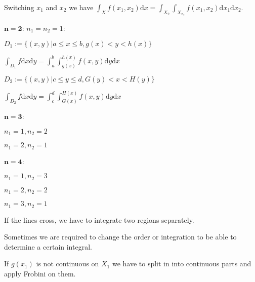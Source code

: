 Switching $x_1$ and $x_2$ we have 
$\int_X f(x_1, x_2) \mathrm{d}x = \int_{X_2} \int_{X_{x_2}} f(x_1, x_2) \mathrm{d}x_1 \mathrm{d}x_2$.

\begin{compactdesc}
    \item[$\mathbf{n = 2}$:] $n_1 = n_2 = 1$:
        \begin{compactitem}
            \item $D_1 := \{(x, y) | a \le x \le b, g(x) < y < h(x) \}$
                \begin{compactitem}
                    \item $\int_{D_1} f \mathrm{d}x \mathrm{d}y = \int_{a}^{b} \int_{g(x)}^{h(x)} f(x, y) \mathrm{d}y\mathrm{d}x$
                \end{compactitem}
            \item $D_2 := \{(x, y) | c \le y \le d, G(y) < x < H(y) \}$
                \begin{compactitem}
                    \item $\int_{D_2} f \mathrm{d}x \mathrm{d}y = \int_{c}^{d} \int_{G(x)}^{H(x)} f(x, y) \mathrm{d}y\mathrm{d}x$
                \end{compactitem}
        \end{compactitem}
    \item[$\mathbf{n = 3}$:] 
        \begin{inparaitem}
            \item  $n_1 = 1, n_2 = 2$
            \item  $n_1 = 2, n_2 = 1$
        \end{inparaitem}
    \item[$\mathbf{n = 4}$:] 
        \begin{inparaitem}
            \item  $n_1 = 1, n_2 = 3$
            \item  $n_1 = 2, n_2 = 2$
            \item  $n_1 = 3, n_2 = 1$
        \end{inparaitem}
\end{compactdesc}

\begin{compactitem}
    \item If the lines cross, we have to integrate two regions separately.
    \item Sometimes we are required to change the order or integration to be able to determine a certain integral.
    \item If $g(x_1)$ is not continuous on $X_1$ we have to split in into continuous parts and apply Frobini on them.
\end{compactitem}

